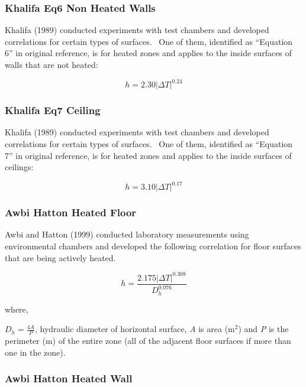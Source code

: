 \subsubsection{Khalifa Eq6 Non Heated Walls}\label{khalifa-eq6-non-heated-walls}

Khalifa (1989) conducted experiments with test chambers and developed correlations for certain types of surfaces.~ One of them, identified as ``Equation 6'' in original reference, is for heated zones and applies to the inside surfaces of walls that are not heated:

\begin{equation}
h = 2.30{\left| {\Delta T} \right|^{0.24}}
\end{equation}

\subsubsection{Khalifa Eq7 Ceiling}\label{khalifa-eq7-ceiling}

Khalifa (1989) conducted experiments with test chambers and developed correlations for certain types of surfaces.~ One of them, identified as ``Equation 7'' in original reference, is for heated zones and applies to the inside surfaces of ceilings:

\begin{equation}
h = 3.10{\left| {\Delta T} \right|^{0.17}}
\end{equation}

\subsubsection{Awbi Hatton Heated Floor}\label{awbi-hatton-heated-floor}

Awbi and Hatton (1999) conducted laboratory measurements using environmental chambers and developed the following correlation for floor surfaces that are being actively heated.

\begin{equation}
h = \frac{{2.175{{\left| {\Delta T} \right|}^{0.308}}}}{{D_h^{0.076}}}
\end{equation}

where,

\({D_h} = \frac{{4A}}{P}\), hydraulic diameter of horizontal surface, \emph{A} is area (m\(^{2}\)) and \emph{P} is the perimeter (m) of the entire zone (all of the adjacent floor surfaces if more than one in the zone).

\subsubsection{Awbi Hatton Heated Wall}\label{awbi-hatton-heated-wall}

